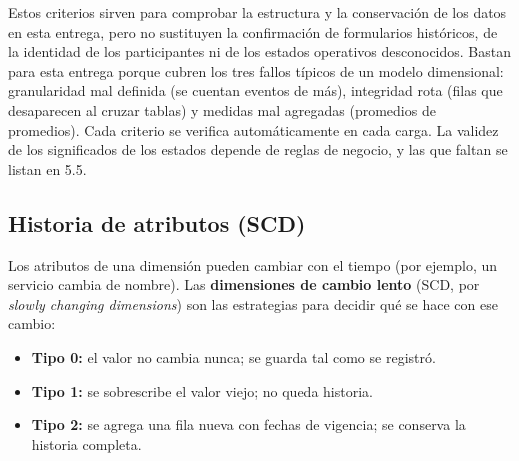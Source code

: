 \documentclass[11pt,letterpaper]{article}
\begin{document}
Estos criterios sirven para comprobar la estructura y la conservación de los datos en esta entrega, pero no sustituyen la confirmación de formularios históricos, de la identidad de los participantes ni de los estados operativos desconocidos. Bastan para esta entrega porque cubren los tres fallos típicos de un modelo dimensional: granularidad mal definida (se cuentan eventos de más), integridad rota (filas que desaparecen al cruzar tablas) y medidas mal agregadas (promedios de promedios). Cada criterio se verifica automáticamente en cada carga. La validez de los significados de los estados depende de reglas de negocio, y las que faltan se listan en 5.5.

\subsection{Historia de atributos (SCD)}

Los atributos de una dimensión pueden cambiar con el tiempo (por ejemplo, un servicio cambia de nombre). Las \textbf{dimensiones de cambio lento} (SCD, por \emph{slowly changing dimensions}) son las estrategias para decidir qué se hace con ese cambio:

\begin{itemize}[leftmargin=1.5em,itemsep=2pt]
\item \textbf{Tipo 0:} el valor no cambia nunca; se guarda tal como se registró.
\item \textbf{Tipo 1:} se sobrescribe el valor viejo; no queda historia.
\item \textbf{Tipo 2:} se agrega una fila nueva con fechas de vigencia; se conserva la historia completa.
\end{itemize}
\end{document}
